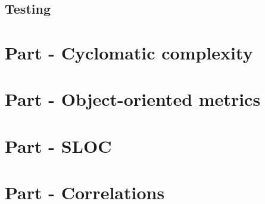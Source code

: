 \documentclass[12pt]{article}
\begin{document}
\subsection{Testing}

\section{Part - Cyclomatic complexity}

\section{Part - Object-oriented metrics}

\section{Part - SLOC}

\section{{Part - Correlations}}

{}

\end{document}

